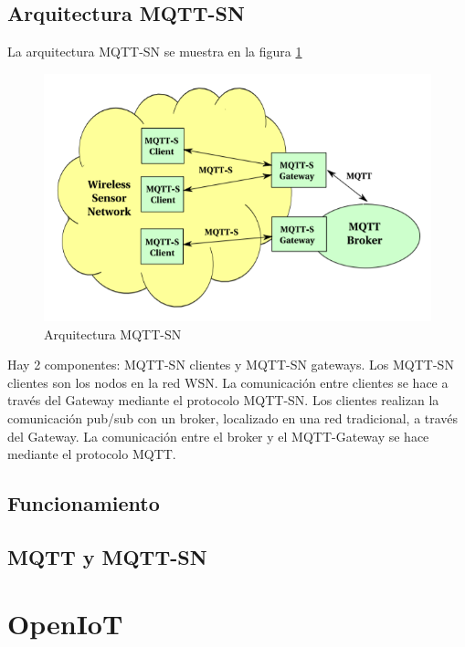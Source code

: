 \documentclass[12pt, twoside]{book}
\begin{document}
\section{Arquitectura MQTT-SN}
La arquitectura MQTT-SN se muestra en la figura \ref{L412}
\begin{figure}[H]
\centering
\includegraphics[scale=0.5]{images/mqttsn}
\caption{Arquitectura MQTT-SN}\label{L412}
\end{figure}
Hay 2 componentes: MQTT-SN clientes y MQTT-SN gateways. Los MQTT-SN clientes son los nodos en la red WSN. La comunicación entre clientes se hace a través del Gateway mediante el protocolo MQTT-SN. Los clientes realizan la comunicación pub/sub con un broker, localizado en una red tradicional, a través del Gateway. La comunicación entre el broker y el MQTT-Gateway se hace mediante el protocolo MQTT.
\section{Funcionamiento}  

\section{MQTT y MQTT-SN}


\chapter{OpenIoT}
\end{document}
